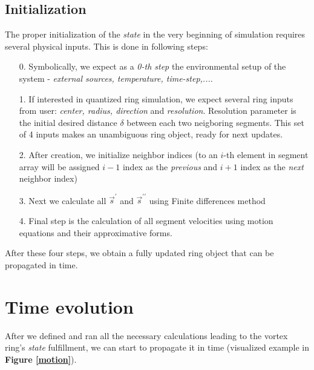 \subsection*{Initialization}

The proper initialization of the \textit{state} in the very beginning of simulation requires several physical inputs. This is done in following steps:
\begin{itemize}
	\item[0.] Symbolically, we expect as a \textit{0-th step} the environmental setup of the system - \textit{external sources, temperature, time-step,...}.

	\item[1.] If interested in quantized ring simulation, we expect several ring inputs from user: \textit{center, radius, direction} and \textit{resolution}.
	Resolution parameter is the initial desired distance $\delta$ between each two neigboring segments. This set of 4 inputs makes an unambiguous ring object, ready for next updates.

	\item[2.] After creation, we initialize neighbor indices (to an $i$-th element in segment array will be assigned $i-1$ index as the \textit{previous} and $i+1$ index as the \textit{next} neighbor index)
	\item[3.] Next we calculate all $\vec{s}^{\prime}$ and $\vec{s}^{\prime\prime}$ using Finite differences method
	\item[4.] Final step is the calculation of all segment velocities using motion equations and their approximative forms.
\end{itemize}

After these four steps, we obtain a fully updated ring object that can be propagated in time.

\section{Time evolution}

After we defined and ran all the necessary calculations leading to the vortex ring's \textit{state} fulfillment, we can start to propagate it in time (visualized example in \textbf{Figure \ref{motion}}).

